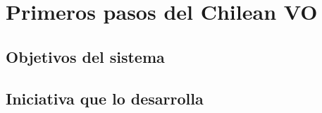 \section{Primeros pasos del Chilean VO}

\subsection{Objetivos del sistema}

\begin{frame}
\frametitle{}
\end{frame}

\subsection{Iniciativa que lo desarrolla}

\begin{frame}
\frametitle{}
\end{frame}
